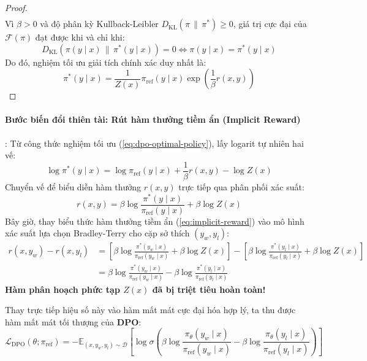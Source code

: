 \begin{proof}
\begin{align*}
\end{align*}
Vì $\beta > 0$ và độ phân kỳ Kullback-Leibler $D_{\text{KL}}(\pi \,\|\, \pi^*) \ge 0$, giá trị cực đại của $\mathcal{F}(\pi)$ đạt được khi và chỉ khi:
\begin{equation}
D_{\text{KL}}\left(\pi(y \mid x) \,\|\, \pi^*(y \mid x)\right) = 0 \iff \pi(y \mid x) = \pi^*(y \mid x)
\end{equation}
Do đó, nghiệm tối ưu giải tích chính xác duy nhất là:
\begin{equation}
\label{eq:dpo-optimal-policy}
\pi^*(y \mid x) = \frac{1}{Z(x)} \pi_{\text{ref}}(y \mid x) \exp\left(\frac{1}{\beta} r(x, y)\right)
\end{equation}
\end{proof}

\paragraph{Bước biến đổi thiên tài: Rút hàm thưởng tiềm ẩn (Implicit Reward)}:
Từ công thức nghiệm tối ưu (\ref{eq:dpo-optimal-policy}), lấy logarit tự nhiên hai vế:
\begin{equation}
\log \pi^*(y \mid x) = \log \pi_{\text{ref}}(y \mid x) + \frac{1}{\beta} r(x, y) - \log Z(x)
\end{equation}
Chuyển vế để biểu diễn hàm thưởng $r(x, y)$ trực tiếp qua phân phối xác suất:
\begin{equation}
\label{eq:implicit-reward}
r(x, y) = \beta \log \frac{\pi^*(y \mid x)}{\pi_{\text{ref}}(y \mid x)} + \beta \log Z(x)
\end{equation}
Bây giờ, thay biểu thức hàm thưởng tiềm ẩn (\ref{eq:implicit-reward}) vào mô hình xác suất lựa chọn Bradley-Terry cho cặp sở thích $(y_w, y_l)$:
\begin{align*}
r(x, y_w) - r(x, y_l) &= \left[\beta \log \frac{\pi^*(y_w \mid x)}{\pi_{\text{ref}}(y_w \mid x)} + \beta \log Z(x)\right] - \left[\beta \log \frac{\pi^*(y_l \mid x)}{\pi_{\text{ref}}(y_l \mid x)} + \beta \log Z(x)\right] \\
&= \beta \log \frac{\pi^*(y_w \mid x)}{\pi_{\text{ref}}(y_w \mid x)} - \beta \log \frac{\pi^*(y_l \mid x)}{\pi_{\text{ref}}(y_l \mid x)}
\end{align*}
\textbf{Hàm phân hoạch phức tạp $Z(x)$ đã bị triệt tiêu hoàn toàn!}

Thay trực tiếp hiệu số này vào hàm mất mát cực đại hóa hợp lý, ta thu được hàm mất mát tối thượng của \textbf{DPO}:
\begin{equation}
\label{eq:dpo-loss}
\mathcal{L}_{\text{DPO}}(\theta; \pi_{\text{ref}}) = -\mathbb{E}_{(x, y_w, y_l) \sim \mathcal{D}} \left[ \log \sigma\left( \beta \log \frac{\pi_\theta(y_w \mid x)}{\pi_{\text{ref}}(y_w \mid x)} - \beta \log \frac{\pi_\theta(y_l \mid x)}{\pi_{\text{ref}}(y_l \mid x)} \right) \right]
\end{equation}

